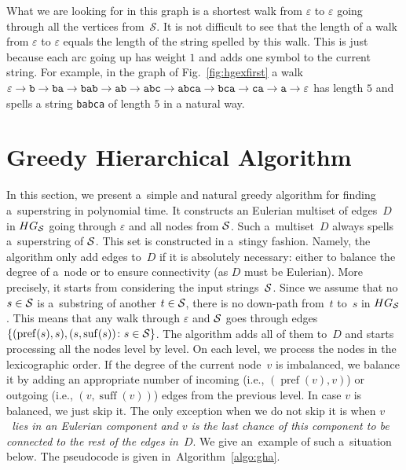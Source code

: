 \documentclass[11pt,letterpaper]{article}
\DeclareMathOperator{\pref}{pref}
\DeclareMathOperator{\suff}{suff}
\begin{document}
What we are looking for in this graph is a shortest
walk from $\varepsilon$ to $\varepsilon$ going through all the vertices from~$\mathcal{S}$.
It is not difficult to see that the length of a walk from $\varepsilon$ to $\varepsilon$ equals the length of the string spelled by this walk. This is just because each arc going up
has weight $1$ and adds one symbol to the current string. 
For example, in the graph of Fig.~\ref{fig:hgexfirst} a walk $\varepsilon\to{\tt b}\to{\tt ba}\to{\tt bab}\to{\tt ab}\to{\tt abc}\to{\tt abca}\to{\tt bca}\to{\tt ca}\to{\tt a}\to\varepsilon$ has length $5$ and spells a string {\tt babca} of length $5$ in a natural way.




\section{Greedy Hierarchical Algorithm}
In this section, we present a~simple and natural
greedy algorithm for finding a~superstring in
polynomial time. It constructs an Eulerian multiset of
edges~$D$ in $HG_{\cal S}$ going through 
$\varepsilon$ and all nodes from ${\cal S}$.
 Such a~multiset~$D$ always spells a~superstring of ${\cal S}$. 
This set is constructed in a~stingy fashion. 
Namely, the algorithm only add edges to~$D$ if it is absolutely necessary: either to balance the degree of a~node or to ensure connectivity (as $D$ must be Eulerian). More precisely, it starts from considering the input strings~${\cal S}$. Since we assume that no $s \in {\cal S}$ is a~substring of another $t \in {\cal S}$, there is no down-path from~$t$ to~$s$ in $HG_{\cal S}$. This means that any walk through $\varepsilon$ and ${\cal S}$ goes through edges $\{(\operatorname{pref}(s), s), (s, \operatorname{suf}(s)) \colon s \in {\cal S}\}$. The algorithm adds all of them to~$D$ and starts processing all the nodes level by level. On each level, we process the nodes in the lexicographic order. If the degree of the current node~$v$ is imbalanced, we balance it by adding an appropriate number of incoming (i.e., $(\pref(v),v)$) or outgoing (i.e., $(v, \suff(v))$) edges from the previous level. In case $v$ is balanced, we just skip it. The only exception when we do not skip it is when {\em $v$~lies in an Eulerian component and $v$ is the last chance of this component to be connected to the rest of the edges in~$D$}. We give an~example of such a~situation below. The pseudocode is given in~Algorithm~\ref{algo:gha}.
\end{document}
